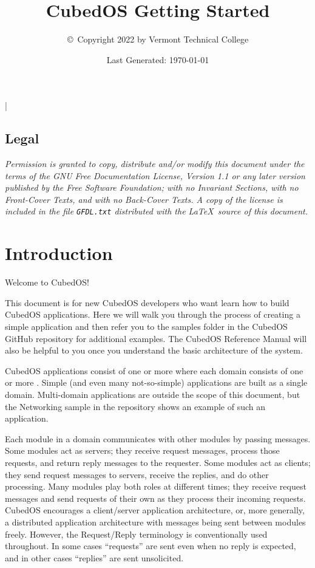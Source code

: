 \documentclass{scrreprt}
\begin{document}
\title{CubedOS Getting Started}
\author{\copyright\ Copyright 2022 by Vermont Technical College}
\date{Last Generated: \today}
\maketitle

\tableofcontents

\lstMakeShortInline|

\section*{Legal}
\label{sec:legal}

\textit{Permission is granted to copy, distribute and/or modify this document under the terms of
  the GNU Free Documentation License, Version 1.1 or any later version published by the Free
  Software Foundation; with no Invariant Sections, with no Front-Cover Texts, and with no
  Back-Cover Texts. A copy of the license is included in the file \texttt{GFDL.txt} distributed
  with the \LaTeX\ source of this document.}

\chapter{Introduction}

Welcome to CubedOS!

This document is for new CubedOS developers who want learn how to build CubedOS applications.
Here we will walk you through the process of creating a simple application and then refer you to
the samples folder in the CubedOS GitHub repository for additional examples. The CubedOS
Reference Manual will also be helpful to you once you understand the basic architecture of the
system.

CubedOS applications consist of one or more  where each domain consists of one
or more . Simple (and even many not-so-simple) applications are built as a
single domain. Multi-domain applications are outside the scope of this document, but the
Networking sample in the repository shows an example of such an application.

Each module in a domain communicates with other modules by passing messages. Some modules act as
servers; they receive request messages, process those requests, and return reply messages to the
requester. Some modules act as clients; they send request messages to servers, receive the
replies, and do other processing. Many modules play both roles at different times; they receive
request messages and send requests of their own as they process their incoming requests. CubedOS
encourages a client/server application architecture, or, more generally, a distributed
application architecture with messages being sent between modules freely. However, the
Request/Reply terminology is conventionally used throughout. In some cases ``requests'' are sent
even when no reply is expected, and in other cases ``replies'' are sent unsolicited.
\end{document}
